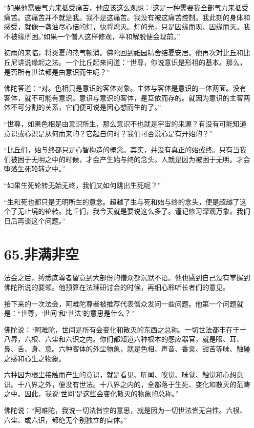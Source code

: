 \documentclass[12pt,twoside,openany]{book}
\begin{document}
“如果他需要气力来抵受痛苦，他应该这么观想：‘这是一种需要我全部气力来抵受痛苦。这痛苦并不就是我。我不是这痛苦。我没有被这痛苦控制。我此刻的身体和感受，就像一盏油尽心桔的灯，快将熄灭。灯的光，只是因缘而现、因缘而灭。我不被缘所困。’如果一个僧人这样修观，平和解脱便会现前。”

初雨的来临，将炎夏的热气顿消。佛陀回到祇园精舍结夏安居。他再次对比丘和比丘尼讲说缘起之法。一个比丘起来问道：“世尊，你说意识是形相的基本。那么，是否所有世法都是由意识而生呢？”

佛陀答道：“对。色相只是意识的客体对象。主体与客体是意识的一体两面。没有客体，就不可能有意识。意识与意识的客体，是互依而存的。就因为意识的主客两体不可分割的关系，它们便可说是因心想而生的了。”

“世尊，如果色相是由意识所生，那么意识不也就是宇宙的来源？有没有可能知道意识或心识是从何而来的？它起自何时？我们可否说心是有开始的？”

“比丘们，始与终都只是心智构造的概念。其实，并没有真正的始或终。只有当我们被困于无明之中的时候，才会产生始与终的念头。人就是因为被困于无明。才会堕落生死轮转之中。”

“如果生死轮转无始无终，我们又如何跳出生死呢？”

“生和死也都只是无明所生的意念。超越了生与死和始与终的念头，便是超越了这个了无止境的轮转。比丘们，我今天就是要说这么多了。谨记修习深观万象。我们日后再谈这个问题。”


\chapter{65.非满非空}\label{ch65}

法会之后，缚悉底尊者留意到大部份的僧众都沉默不语。他也感到自己没有掌握到佛陀所说的要领。他预算在法理研讨会的时候，再细心聆听长者们的意见。

接下来的一次法会，阿难陀尊者被推荐代表僧众发问一些问题。他第一个问题就是：“世尊，‘世间’和‘世法’的意思是什么？”

佛陀说：“阿难陀，世间是所有会变化和散灭的东西之总称。一切世法都丰在于十八界，六根、六尘和六识之内。你们都知道六种根本的感应器官，就是眼、耳、鼻、舌、身、意。六种客体的外尘物象，就是色相、声音、香臭、甜苦等味、触碰之感和心生之物象。

六种因为根尘接触而产生的意识，就是看见、听闻、嗅觉、味觉、触觉和心想意识。十八界之外，便没有世法。十八界之内的，全都落于生死、变化和散灭的范畴之中。因此，我说‘世间’是这些会变化散灭的物象的总称。”

佛陀说：“阿难陀，我说一切法皆空的意思，就是因为一切世法皆无自性。六根、六尘、或六识，都绝无个别独立的自体。”
\end{document}
